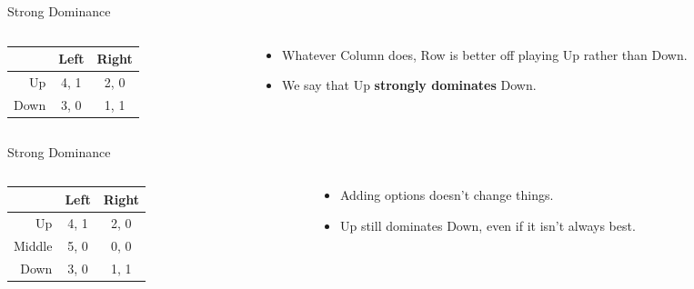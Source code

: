 \documentclass[
  14pt,
  letterpaper,
  ignorenonframetext,
  aspectratio=169,
  handout]{beamer}
\providecommand{\tightlist}{%
  \setlength{\itemsep}{0pt}\setlength{\parskip}{0pt}}\usepackage{longtable,booktabs,array}
\let\olditem\item
\renewcommand{\item}{%
\olditem\vspace{6pt}}
\begin{document}
\begin{frame}{Strong Dominance}
\protect\hypertarget{strong-dominance}{}
\begin{columns}[T]
\begin{column}{0.4\textwidth}
\begin{table}[!h]
\centering
\begin{tabular}[t]{>{}r|cc}
\toprule
 & Left & Right\\
\midrule
Up & 4, 1 & 2, 0\\
Down & 3, 0 & 1, 1\\
\bottomrule
\end{tabular}
\end{table}
\end{column}

\begin{column}{0.6\textwidth}
\begin{itemize}[<+->]
\tightlist
\item
  Whatever Column does, Row is better off playing Up rather than Down.
\item
  We say that Up \textbf{strongly dominates} Down.
\end{itemize}
\end{column}
\end{columns}
\end{frame}

\begin{frame}[fragile]{Strong Dominance}
\protect\hypertarget{strong-dominance-1}{}
\begin{columns}[T]
\begin{column}{0.4\textwidth}
\begin{table}[!h]
\centering
\begin{tabular}[t]{>{}r|cc}
\toprule
 & Left & Right\\
\midrule
Up & 4, 1 & 2, 0\\
Middle & 5, 0 & 0, 0\\
Down & 3, 0 & 1, 1\\
\bottomrule
\end{tabular}
\end{table}
\end{column}

\begin{column}{0.6\textwidth}
\begin{itemize}[<+->]
\tightlist
\item
  Adding options doesn't change things.
\item
  Up still dominates Down, even if it isn't always best.
\end{itemize}
\end{column}
\end{columns}
\end{frame}
\end{document}
